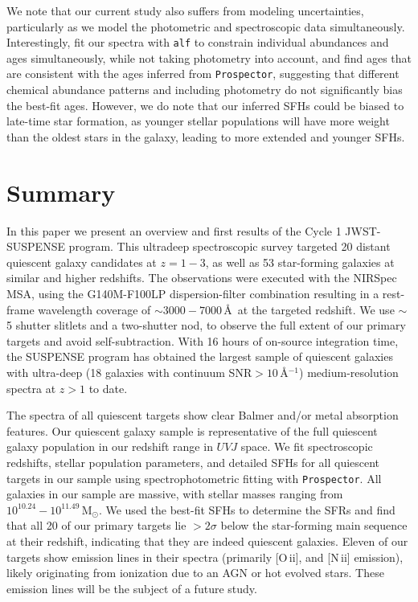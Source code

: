 \documentclass[twocolumn, astrosymb]{aastex631}
\begin{document}
We note that our current study also suffers from modeling uncertainties, particularly as we model the photometric and spectroscopic data simultaneously. Interestingly, \citet{ABeverage2024b} fit our spectra with \texttt{alf} \citep{CConroy2012d, CConroy2018} to constrain individual abundances and ages simultaneously, while not taking photometry into account, and find ages that are consistent with the ages inferred from \texttt{Prospector}, suggesting that different chemical abundance patterns and including photometry do not significantly bias the best-fit ages. However, we do note that our inferred SFHs could be biased to late-time star formation, as younger stellar populations will have more weight than the oldest stars in the galaxy, leading to more extended and younger SFHs.

\section{Summary}\label{sec:summary}
In this paper we present an overview and first results of the Cycle 1 JWST-SUSPENSE program. This ultradeep spectroscopic survey targeted 20 distant quiescent galaxy candidates at $z = 1-3$, as well as 53 star-forming galaxies at similar and higher redshifts. The observations were executed with the NIRSpec MSA, using the G140M-F100LP dispersion-filter combination resulting in a rest-frame wavelength coverage of $\sim3000-7000$\,\AA\ at the targeted redshift.
We use $\sim$5 shutter slitlets and a two-shutter nod, to observe the full extent of our primary targets and avoid self-subtraction.
With 16 hours of on-source integration time, the SUSPENSE program has obtained the largest sample of quiescent galaxies with ultra-deep (18 galaxies with continuum SNR$>10$\,\AA$^{-1}$) medium-resolution spectra at $z > 1$ to date.

The spectra of all quiescent targets show clear Balmer and/or metal absorption features. Our quiescent galaxy sample is representative of the full quiescent galaxy population in our redshift range in $UVJ$ space. We fit spectroscopic redshifts, stellar population parameters, and detailed SFHs for all quiescent targets in our sample using spectrophotometric fitting with \texttt{Prospector}. All galaxies in our sample are massive, with stellar masses ranging from $10^{10.24}-10^{11.49}$\,M$_{\odot}$. We used the best-fit SFHs to determine the SFRs and find that all 20 of our primary targets lie $>2\sigma$ below the star-forming main sequence at their redshift, indicating that they are indeed quiescent galaxies. Eleven of our targets show emission lines in their spectra (primarily [O\,{\sc ii}], and [N\,{\sc ii}] emission), likely originating from ionization due to an AGN or hot evolved stars. These emission lines will be the subject of a future study.
\end{document}
